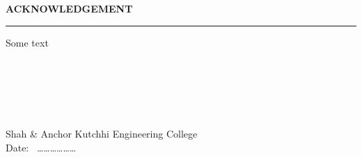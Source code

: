 \thispagestyle{empty}

\begin{center}
{\Large {\bf \uppercase{Acknowledgement}}}
\end{center}

\vspace{\baselineskip}
\hrule
\vspace{2\baselineskip}

Some text


\bigskip


\bigskip





\noindent
\vspace{\baselineskip} \\
\textbf{\studentNamea} \\
\textbf{\studentNameb} \\
\textbf{\studentNamec} \\
\textbf{\studentNamed} \\
Shah \& Anchor Kutchhi Engineering College \\
Date: \ ………………